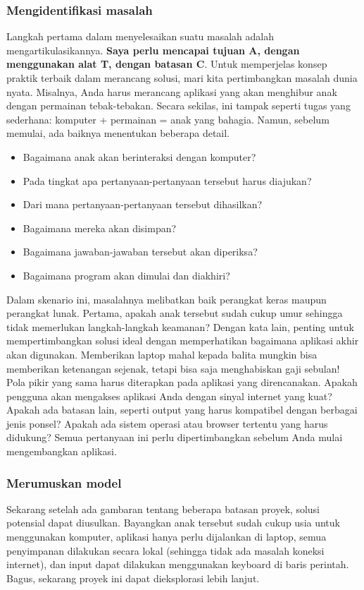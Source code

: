 \documentclass{article}
\begin{document}
\subsubsection{Mengidentifikasi masalah}
Langkah pertama dalam menyelesaikan suatu masalah adalah mengartikulasikannya. \textbf{Saya perlu mencapai tujuan A, dengan menggunakan alat T, dengan batasan C}. Untuk memperjelas konsep praktik terbaik dalam merancang solusi, mari kita pertimbangkan masalah dunia nyata. Misalnya, Anda harus merancang aplikasi yang akan menghibur anak dengan permainan tebak-tebakan. Secara sekilas, ini tampak seperti tugas yang sederhana: komputer + permainan = anak yang bahagia. Namun, sebelum memulai, ada baiknya menentukan beberapa detail.
\begin{itemize}
    \item Bagaimana anak akan berinteraksi dengan komputer?
    \item Pada tingkat apa pertanyaan-pertanyaan tersebut harus diajukan?
    \item Dari mana pertanyaan-pertanyaan tersebut dihasilkan?
    \item Bagaimana mereka akan disimpan?
    \item Bagaimana jawaban-jawaban tersebut akan diperiksa?
    \item Bagaimana program akan dimulai dan diakhiri?
\end{itemize}

Dalam skenario ini, masalahnya melibatkan baik perangkat keras maupun perangkat lunak. Pertama, apakah anak tersebut sudah cukup umur sehingga tidak memerlukan langkah-langkah keamanan? Dengan kata lain, penting untuk mempertimbangkan solusi ideal dengan memperhatikan bagaimana aplikasi akhir akan digunakan. Memberikan laptop mahal kepada balita mungkin bisa memberikan ketenangan sejenak, tetapi bisa saja menghabiskan gaji sebulan! Pola pikir yang sama harus diterapkan pada aplikasi yang direncanakan. Apakah pengguna akan mengakses aplikasi Anda dengan sinyal internet yang kuat? Apakah ada batasan lain, seperti output yang harus kompatibel dengan berbagai jenis ponsel? Apakah ada sistem operasi atau browser tertentu yang harus didukung? Semua pertanyaan ini perlu dipertimbangkan sebelum Anda mulai mengembangkan aplikasi.

\subsubsection{Merumuskan model}
Sekarang setelah ada gambaran tentang beberapa batasan proyek, solusi potensial dapat diusulkan. Bayangkan anak tersebut sudah cukup usia untuk menggunakan komputer, aplikasi hanya perlu dijalankan di laptop, semua penyimpanan dilakukan secara lokal (sehingga tidak ada masalah koneksi internet), dan input dapat dilakukan menggunakan keyboard di baris perintah. Bagus, sekarang proyek ini dapat dieksplorasi lebih lanjut.
\end{document}
